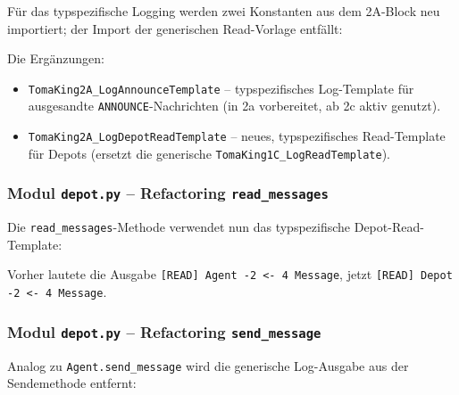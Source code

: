 Für das typspezifische Logging werden zwei Konstanten aus dem 2A-Block neu importiert; der Import der generischen Read-Vorlage entfällt:



Die Ergänzungen:
\begin{itemize}
    \item \texttt{TomaKing2A\_LogAnnounceTemplate} -- typspezifisches Log-Template für ausgesandte \texttt{ANNOUNCE}-Nachrichten (in 2a vorbereitet, ab 2c aktiv genutzt).
    \item \texttt{TomaKing2A\_LogDepotReadTemplate} -- neues, typspezifisches Read-Template für Depots (ersetzt die generische \texttt{TomaKing1C\_LogReadTemplate}).
\end{itemize}


\subsubsection{Modul \texttt{depot.py} – Refactoring \texttt{read\_messages}}

Die \texttt{read\_messages}-Methode verwendet nun das typspezifische Depot-Read-Template:



Vorher lautete die Ausgabe \texttt{[READ] Agent -2 <- 4 Message}, jetzt \texttt{[READ] Depot -2 <- 4 Message}.


\subsubsection{Modul \texttt{depot.py} – Refactoring \texttt{send\_message}}

Analog zu \texttt{Agent.send\_message} wird die generische Log-Ausgabe aus der Sendemethode entfernt:



